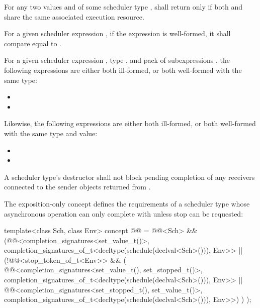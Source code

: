 \pnum
For any two values  and 
of some scheduler type ,
 shall return 
only if both  and  share
the same associated execution resource.

\pnum
For a given scheduler expression ,
if the expression
is well-formed,
it shall compare equal to .

\pnum
For a given scheduler expression ,
type , and
pack of subexpressions ,
the following expressions are either both ill-formed, or
both well-formed with the same type:
\begin{itemize}
\item {}
\item {}
\end{itemize}
Likewise, the following expressions are either both ill-formed, or
both well-formed with the same type and value:
\begin{itemize}
\item {}
\item {}
\end{itemize}

\pnum
A scheduler type's destructor shall not block
pending completion of any receivers
connected to the sender objects returned from .

\pnum
The exposition-only  concept
defines the requirements of a scheduler type
whose  asynchronous operation
can only complete with  unless stop can be requested:
\begin{codeblock}
template<class Sch, class Env>
  concept @@ =
    @@<Sch> &&
    (@@<completion_signatures<set_value_t()>,
             completion_signatures_of_t<decltype(schedule(declval<Sch>())), Env>> ||
     (!@@<stop_token_of_t<Env>> && (
      @@<completion_signatures<set_value_t(), set_stopped_t()>,
             completion_signatures_of_t<decltype(schedule(declval<Sch>())), Env>> ||
     @@<completion_signatures<set_stopped_t(), set_value_t()>,
             completion_signatures_of_t<decltype(schedule(declval<Sch>())), Env>>)
     )
    );
\end{codeblock}

